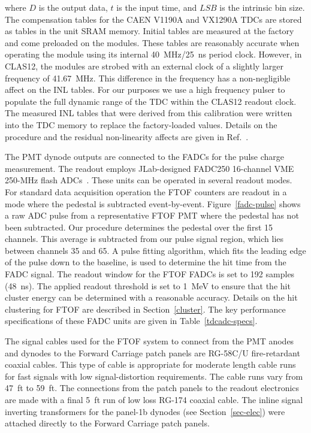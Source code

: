 \documentclass{elsart}
\begin{document}
\noindent
where $D$ is the output data, $t$ is the input time, and $LSB$ is the intrinsic bin size. The compensation
tables for the CAEN V1190A and VX1290A TDCs are stored as tables in the unit SRAM memory. Initial
tables are measured at the factory and come preloaded on the modules. These tables are reasonably
accurate when operating the module using its internal 40~MHz/25~ns period clock. However, in CLAS12,
the modules are strobed with an external clock of a slightly larger frequency of 41.67~MHz. This difference
in the frequency has a non-negligible affect on the INL tables. For our purposes we use a high frequency pulser
to populate the full dynamic range of the TDC within the CLAS12 readout clock. The measured INL tables that
were derived from this calibration were written into the TDC memory to replace the factory-loaded values.
Details on the procedure and the residual non-linearity affects are given in Ref.~\cite{inl-tables}.

The PMT dynode outputs are connected to the FADCs for the pulse charge measurement. The readout
employs JLab-designed FADC250 16-channel VME 250-MHz flash ADCs~\cite{fadc-manual}. These units
can be operated in several readout modes. For standard data acquisition operation the FTOF counters are
readout in a mode where the pedestal is subtracted event-by-event. Figure~\ref{fadc-pulse} shows a raw
ADC pulse from a representative FTOF PMT where the pedestal has not been subtracted. Our procedure
determines the pedestal over the first 15 channels. This average is subtracted from our pulse signal region,
which lies between channels 35 and 65. A pulse fitting algorithm, which fits the leading edge of the pulse
down to the baseline, is used to determine the hit time from the FADC signal. The readout window for the
FTOF FADCs is set to 192 samples (48~ns). The applied readout threshold is set to 1~MeV to ensure that
the hit cluster energy can be determined with a reasonable accuracy. Details on the hit clustering for FTOF
are described in Section~\ref{cluster}. The key performance specifications of these FADC units are given
in Table~\ref{tdcadc-specs}.

The signal cables used for the FTOF system to connect from the PMT anodes and dynodes to the Forward
Carriage patch panels are RG-58C/U fire-retardant coaxial cables. This type of cable is appropriate for
moderate length cable runs for fast signals with low signal-distortion requirements. The cable runs vary
from 47~ft to 59~ft. The connections from the patch panels to the readout electronics are made with a
final 5~ft run of low loss RG-174 coaxial cable. The inline signal inverting transformers for the panel-1b
dynodes (see Section~\ref{sec-elec}) were attached directly to the Forward Carriage patch panels.
\end{document}
